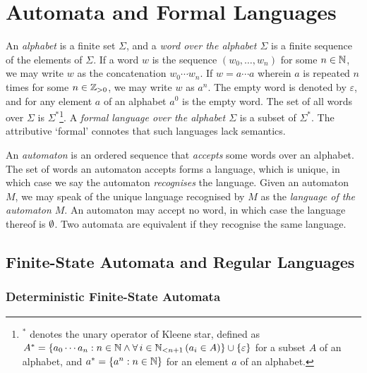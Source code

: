 


\usepackage{tikz}
\usetikzlibrary{automata,decorations.markings}
\newcommand*{\pt}{5mm}


\section{Automata and Formal Languages}

An \emph{alphabet} is a finite set \(\Sigma\), and a \emph{word over the alphabet \(\Sigma\)} is a finite sequence of
the elements of \(\Sigma\). If a word \(w\) is the sequence \((w_0, \ldots, w_n)\) for some \(n \in \setnat\), we may
write \(w\) as the concatenation \(w_0 \cdots w_n\). If \(w = a \cdots a\) wherein \(a\) is repeated \(n\) times for
some \(n \in \posint\), we may write \(w\) as \(a^n\). The empty word is denoted by \(\varepsilon\), and for any element
\(a\) of an alphabet \(a^0\) is the empty word. The set of all words over \(\Sigma\) is \(\Sigma^*\)\footnote{\(^*\)
denotes the unary operator of Kleene star, defined as \(A^* = \set{a_0 \cdots a_n : n \in \setnat
\land \forall \, i \in \Nln[n + 1] \, (a_i \in A)} \cup \set{\varepsilon}\) for a subset \(A\) of an alphabet, and
\(a^* = \set{a^n : n \in \setnat}\) for an element \(a\) of an alphabet.}. A \emph{formal language over the alphabet
\(\Sigma\)} is a subset of \(\Sigma^*\). The attributive `formal' connotes that such languages lack semantics.

An \emph{automaton} is an ordered sequence that \emph{accepts} some words over an alphabet. The set of words an
automaton accepts forms a language, which is unique, in which case we say the automaton \emph{recognises} the language.
Given an automaton \(M\), we may speak of the unique language recognised by \(M\) as the \emph{language of the automaton
\(M\)}. An automaton may accept no word, in which case the language thereof is \(\nset\). Two automata are equivalent if
they recognise the same language.

\subsection{Finite-State Automata and Regular Languages}

\subsubsection{Deterministic Finite-State Automata}

